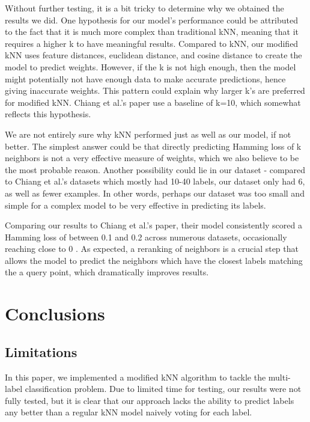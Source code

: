\documentclass{article}
\begin{document}
Without further testing, it is a bit tricky to determine why we obtained the results we did. One hypothesis for our model's performance could be attributed to the fact that it is much more complex than traditional kNN, meaning that it requires a higher k to have meaningful results. Compared to kNN, our modified kNN uses feature distances, euclidean distance, and cosine distance to create the model to predict weights. However, if the k is not high enough, then the model might potentially not have enough data to make accurate predictions, hence giving inaccurate weights. This pattern could explain why larger k's are preferred for modified kNN. Chiang et al.'s paper use a baseline of k=10, which somewhat reflects this hypothesis. 

We are not entirely sure why kNN performed just as well as our model, if not better. The simplest answer could be that directly predicting Hamming loss of k neighbors is not a very effective measure of weights, which we also believe to be the most probable reason. Another possibility could lie in our dataset - compared to Chiang et al.'s datasets which mostly had 10-40 labels, our dataset only had 6, as well as fewer examples. In other words, perhaps our dataset was too small and simple for a complex model to be very effective in predicting its labels. 

Comparing our results to Chiang et al.'s paper, their model consistently scored a Hamming loss of between 0.1 and 0.2 across numerous datasets, occasionally reaching close to 0 . As expected, a reranking of neighbors is a crucial step that allows the model to predict the neighbors which have the closest labels matching the a query point, which dramatically improves results.

\section{Conclusions}
\label{conclusion}

\subsection{Limitations}

In this paper, we implemented a modified kNN algorithm to tackle the multi-label classification problem. Due to limited time for testing, our results were not fully tested, but it is clear that our approach lacks the ability to predict labels any better than a regular kNN model naively voting for each label.
\end{document}
